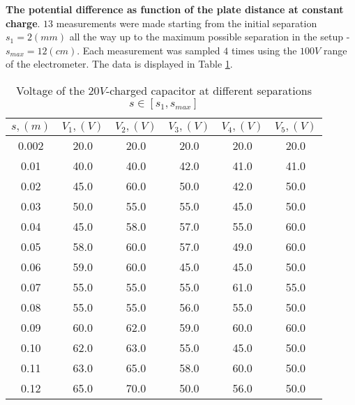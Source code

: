 \textbf{The potential difference as function of the plate distance at constant charge}. $13$ measurements were made starting from the initial separation $s_1 = 2(mm)$ all the way up to the maximum possible separation in the setup - $s_{max} = 12 (cm)$. Each measurement was sampled $4$ times using the $100V$ range of the electrometer. The data is displayed in Table \ref{tab:appendix:data:exp3}.
\begin{table}[H]
    \centering
    \begin{tabular}{|c|ccccc|}
        \hline
        $s, (m)$ & $V_1, (V)$ & $V_2, (V)$ & $V_3, (V)$ & $V_4, (V)$ & $V_5, (V)$ \\
        \hline
        0.002 & 20.0 & 20.0 & 20.0 & 20.0 & 20.0 \\
        0.01  & 40.0 & 40.0 & 42.0 & 41.0 & 41.0 \\
        0.02  & 45.0 & 60.0 & 50.0 & 42.0 & 50.0 \\
        0.03  & 50.0 & 55.0 & 55.0 & 45.0 & 50.0 \\
        0.04  & 45.0 & 58.0 & 57.0 & 55.0 & 60.0 \\
        0.05  & 58.0 & 60.0 & 57.0 & 49.0 & 60.0 \\
        0.06  & 59.0 & 60.0 & 45.0 & 45.0 & 50.0 \\
        0.07  & 55.0 & 55.0 & 55.0 & 61.0 & 55.0 \\
        0.08  & 55.0 & 55.0 & 56.0 & 55.0 & 50.0 \\
        0.09  & 60.0 & 62.0 & 59.0 & 60.0 & 60.0 \\
        0.10  & 62.0 & 63.0 & 55.0 & 45.0 & 50.0 \\
        0.11  & 63.0 & 65.0 & 58.0 & 60.0 & 50.0 \\
        0.12  & 65.0 & 70.0 & 50.0 & 56.0 & 50.0 \\
        \hline
    \end{tabular}
    \caption{Voltage of the $20V$-charged capacitor at different separations $s \in \left[ s_1, s_{max}\right]$}
    \label{tab:appendix:data:exp3}
\end{table}